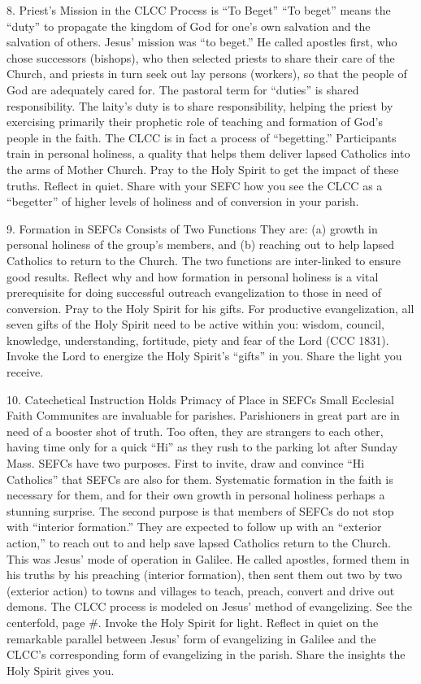 \documentclass[oneside]{book}
\begin{document}
8. Priest's Mission in the CLCC Process is ``To Beget''
``To beget'' means the ``duty'' to propagate the kingdom of God for one's own
salvation and the salvation of others. Jesus' mission was ``to beget.'' He
called apostles first, who chose successors (bishops), who then selected priests
to share their care of the Church, and priests in turn seek out lay persons
(workers), so that the people of God are adequately cared for. The pastoral term
for ``duties'' is shared responsibility. The laity's duty is to share
responsibility, helping the priest by exercising primarily their prophetic role
of teaching and formation of God's people in the faith. The CLCC is in fact a
process of ``begetting.'' Participants train in personal holiness, a quality
that helps them deliver lapsed Catholics into the arms of Mother Church.  Pray
to the Holy Spirit to get the impact of these truths. Reflect in quiet. Share
with your SEFC how you see the CLCC as a ``begetter'' of higher levels of
holiness and of conversion in your parish.

9. Formation in SEFCs Consists of Two Functions
They are:  (a) growth in personal holiness of the group's members, and (b)
reaching out to help lapsed Catholics to return to the Church.  The two
functions are inter-linked to ensure good results. Reflect why and how formation
in personal holiness is a vital prerequisite for doing successful outreach
evangelization to those in need of conversion. Pray to the Holy Spirit for his
gifts. For productive evangelization, all seven gifts of the Holy Spirit need to
be active within you: wisdom, council, knowledge, understanding, fortitude,
piety and fear of the Lord (CCC 1831). Invoke the Lord to energize the Holy
Spirit's ``gifts'' in you. Share the light you receive.

10. Catechetical Instruction Holds Primacy of Place in SEFCs
Small Ecclesial Faith Communites are invaluable for parishes. Parishioners in
great part are in need of a booster shot of truth. Too often, they are strangers
to each other, having time only for a quick ``Hi'' as they rush to the parking
lot after Sunday Mass. SEFCs have two purposes. First to invite, draw and
convince ``Hi Catholics'' that SEFCs are also for them. Systematic formation in
the faith is necessary for them, and for their own growth in personal holiness
perhaps a stunning surprise. The second purpose is that members of SEFCs do not
stop with ``interior formation.'' They are expected to follow up with an
``exterior action,'' to reach out to and help save lapsed Catholics return to
the Church. This was Jesus' mode of operation in Galilee. He called apostles,
formed them in his truths by his preaching (interior formation), then sent them
out two by two (exterior action) to towns and villages to teach, preach, convert
and drive out demons. The CLCC process is modeled on Jesus' method of
evangelizing. See the centerfold, page \#. Invoke the Holy Spirit for
light. Reflect in quiet on the remarkable parallel between Jesus' form of
evangelizing in Galilee and the CLCC's corresponding form of evangelizing in the
parish. Share the insights the Holy Spirit gives you.
\end{document}
